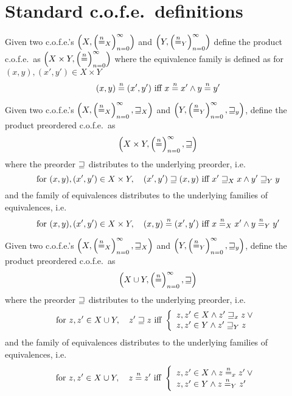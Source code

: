  \section{Standard c.o.f.e.\ definitions}
  \label{app:cofe}
\begin{definition}[Product c.o.f.e.]
\label{def:product-cofe}
Given two c.o.f.e.'s $\left(X, \left(\nequal_X\right)_{n=0}^{\infty} \right)$ and $\left(Y, \left(\nequal_Y\right)_{n=0}^{\infty} \right)$ define the product c.o.f.e.\ as $\left(X \times Y, \left(\nequal \right)_{n=0}^{\infty} \right)$ where the equivalence family is defined as for $(x,y),(x',y') \in X \times Y$
\[
  (x,y) \nequal (x',y') \text{ iff } x \nequal x' \wedge y \nequal y'
\]
\end{definition}
\begin{definition}
  \label{def:product-p-cofe}
  Given two c.o.f.e.'s $\left(X,\left(\nequal[n]_X\right)_{n=0}^{\infty}, \future_X \right)$ and $\left(Y,\left(\nequal[n]_{Y}\right)_{n=0}^{\infty}, \future_y \right)$, define the product preordered c.o.f.e.\ as
  \[
  \left(X \times Y ,\left(\nequal[n]\right)_{n=0}^{\infty},\future \right)
  \]
  where the preorder $\future$ distributes to the underlying preorder, i.e.\
  \[
\text{for } (x,y),(x',y') \in X \times Y, \quad    (x',y') \future (x,y) \text{ iff } x' \future_X x \wedge y' \future_Y y
  \]
  and the family of equivalences distributes to the underlying families of equivalences, i.e.\
  \[
\text{for } (x,y),(x',y') \in X \times Y, \quad    (x,y) \nequal (x',y') \text{ iff } x \nequal_X x' \wedge y \nequal_Y y'
  \]
\end{definition}
\begin{definition}
  \label{def:sum-p-cofe}
  Given two c.o.f.e.'s $\left(X,\left(\nequal[n]_X\right)_{n=0}^{\infty}, \future_X \right)$ and $\left(Y,\left(\nequal[n]_Y\right)_{n=0}^{\infty}, \future_y \right)$, define the product preordered c.o.f.e.\ as
  \[
  \left(X \cup Y ,\left(\nequal[n]\right)_{n=0}^{\infty},\future \right)
  \]
  where the preorder $\future$ distributes to the underlying preorder, i.e.\ 
  \[
    \text{for } z,z' \in X \cup Y,\quad  z' \future z \text{ iff } \left\{
      \begin{array}{l}
        z,z' \in X \wedge z' \future_x z \vee{} \\
        z,z' \in Y \wedge z' \future_Y z
      \end{array}
    \right.
  \]
  and the family of equivalences distributes to the underlying families of equivalences, i.e.\
  \[
    \text{for } z,z' \in X \cup Y,\quad  z \nequal z' \text{ iff } \left\{
      \begin{array}{l}
        z,z' \in X \wedge z \nequal_x z' \vee{} \\
        z,z' \in Y \wedge z \nequal_Y z'
      \end{array}
    \right.
  \]
\end{definition}
